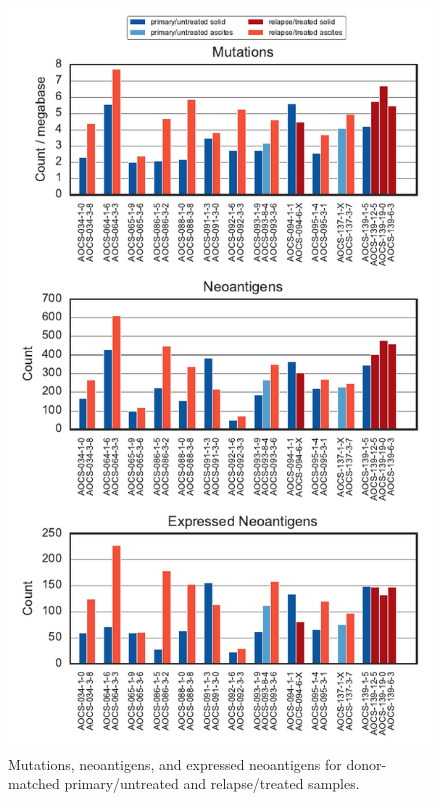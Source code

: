 \documentclass{article}
\begin{document}
\begin{figure}
\centering
\includegraphics[scale=1.0]{../figures/paired_counts.pdf}
\caption{Mutations, neoantigens, and expressed neoantigens for donor-matched primary/untreated and relapse/treated samples.}
\label{fig:supp_paired}
\end{figure}
\end{document}
